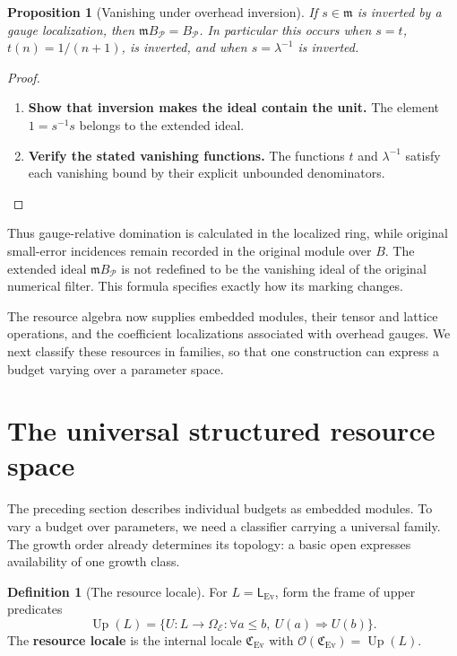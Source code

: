 \documentclass[11pt,a4paper]{article}
\numberwithin{algorithm}{section}
\numberwithin{equation}{section}
\newtheorem{proposition}[proposition]{Proposition}
\theoremstyle{definition}
\newtheorem{definition}[definition]{Definition}
\theoremstyle{remark}
\theoremstyle{plain}
\newcommand{\E}{\mathcal E}
\newcommand{\Truth}{\Omega_{\E}}
\newcommand{\Ev}{{\operatorname{Ev}}}
\newcommand{\Cplx}{\mathfrak C_{\Ev}}
\newcommand{\Up}{\operatorname{Up}}
\theoremstyle{definition}
\theoremstyle{plain}
\begin{document}
\begin{proposition}[Vanishing under overhead inversion]
\label{prop:gauge-vanishing}
If $s\in\mathfrak m$ is inverted by a gauge localization,
then $\mathfrak m B_{\mathcal P}=B_{\mathcal P}$.
In particular this occurs when $s=t$, $t(n)=1/(n+1)$,
is inverted, and when $s=\lambda^{-1}$ is inverted.
\end{proposition}
\begin{proof}\leavevmode
\begin{enumerate}[leftmargin=*,align=left]
\item \textbf{Show that inversion makes the ideal contain the unit.}
The element $1=s^{-1}s$ belongs to the extended ideal.

\item \textbf{Verify the stated vanishing functions.}
The functions $t$ and $\lambda^{-1}$ satisfy each vanishing
bound by their explicit unbounded denominators.
\end{enumerate}
\end{proof}
Thus gauge-relative domination is calculated in the localized
ring, while original small-error incidences remain recorded
in the original module over $B$.
The extended ideal $\mathfrak m B_{\mathcal P}$ is not
redefined to be the vanishing ideal of the original numerical
filter. This formula specifies exactly how its marking changes.

The resource algebra now supplies embedded modules, their tensor and
lattice operations, and the coefficient localizations associated with
overhead gauges. We next classify these resources in families, so that
one construction can express a budget varying over a parameter space.


\section{The universal structured resource space}
\label{sec:complexity-locale}

The preceding section describes individual budgets as embedded modules.
To vary a budget over parameters, we need a classifier carrying a
universal family. The growth order already determines its topology:
a basic open expresses availability of one growth class.


\begin{definition}[The resource locale]\label{def:resource-locale}
For $L=\mathsf L_{\Ev}$, form the frame of upper predicates
\[
 \Up(L)=\{U:L\to\Truth:\forall a\le b,\ U(a)\Rightarrow U(b)\}.
\]
The \textbf{resource locale} is the internal locale $\Cplx$ with
$\mathcal O(\Cplx)=\Up(L)$.
\end{definition}
\end{document}
